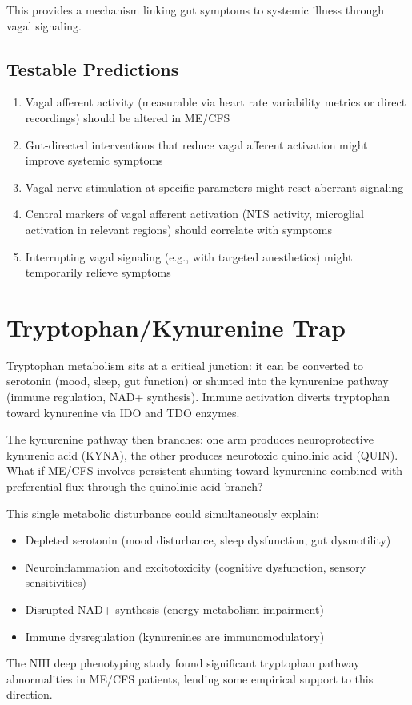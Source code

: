 This provides a mechanism linking gut symptoms to systemic illness through vagal signaling.

\subsection{Testable Predictions}

\begin{enumerate}
    \item Vagal afferent activity (measurable via heart rate variability metrics or direct recordings) should be altered in ME/CFS
    \item Gut-directed interventions that reduce vagal afferent activation might improve systemic symptoms
    \item Vagal nerve stimulation at specific parameters might reset aberrant signaling
    \item Central markers of vagal afferent activation (NTS activity, microglial activation in relevant regions) should correlate with symptoms
    \item Interrupting vagal signaling (e.g., with targeted anesthetics) might temporarily relieve symptoms
\end{enumerate}


\section{Tryptophan/Kynurenine Trap}
\label{sec:kynurenine-trap}

\begin{open_question}
Tryptophan metabolism sits at a critical junction: it can be converted to serotonin (mood, sleep, gut function) or shunted into the kynurenine pathway (immune regulation, NAD+ synthesis). Immune activation diverts tryptophan toward kynurenine via IDO and TDO enzymes.

The kynurenine pathway then branches: one arm produces neuroprotective kynurenic acid (KYNA), the other produces neurotoxic quinolinic acid (QUIN). What if ME/CFS involves persistent shunting toward kynurenine combined with preferential flux through the quinolinic acid branch?

This single metabolic disturbance could simultaneously explain:
\begin{itemize}
    \item Depleted serotonin (mood disturbance, sleep dysfunction, gut dysmotility)
    \item Neuroinflammation and excitotoxicity (cognitive dysfunction, sensory sensitivities)
    \item Disrupted NAD+ synthesis (energy metabolism impairment)
    \item Immune dysregulation (kynurenines are immunomodulatory)
\end{itemize}

The NIH deep phenotyping study found significant tryptophan pathway abnormalities in ME/CFS patients, lending some empirical support to this direction.
\end{open_question}

